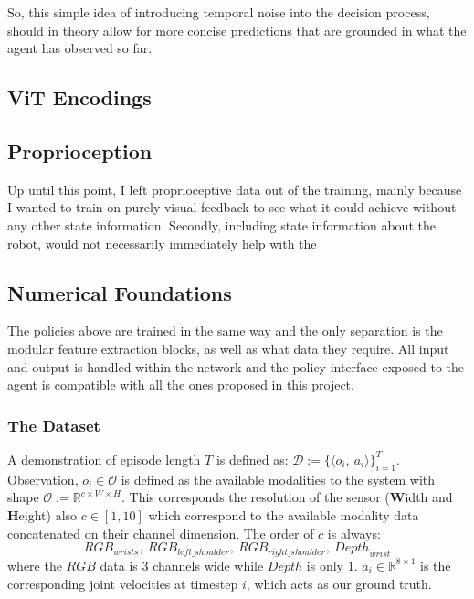 So, this simple idea of introducing temporal noise into the decision process, should in theory allow for more concise predictions that are grounded in what the agent has observed so far.

\subsection{ViT Encodings}



\subsection{Proprioception}
Up until this point, I left proprioceptive data out of the training, mainly because I wanted to train on purely visual feedback to see what it could achieve without any other state information. Secondly, including state information about the robot, would not necessarily immediately help with the 

\subsection{Numerical Foundations}

The policies above are trained in the same way and the only separation is the modular feature extraction blocks, as well as what data they require. All input and output is handled within the network and the policy interface exposed to the agent is compatible with all the ones proposed in this project.

\subsubsection{The Dataset}
A demonstration of episode length $T$ is defined as: \(\mathcal{D} := \{\langle o_i, ~a_i\rangle\}_{i = 1}^{T} \). Observation, \(o_i \in \mathcal{O}\) is defined as the available modalities to the system with shape \(\mathcal{O} := \mathbb{R}^{c \times W \times H}\). This corresponds the resolution of the sensor (\textbf{W}idth and \textbf{H}eight) also $c \in \left[1, 10\right]$ which correspond to the available modality data concatenated on their channel dimension. The order of $c$ is always:
\[
{RGB}_{wrists}, ~{RGB}_{{left}\_{shoulder}}, ~{RGB}_{{right}\_{shoulder}}, ~{Depth}_{wrist}
\] 
where the $RGB$ data is $3$ channels wide while $Depth$ is only 1. \(a_i \in \mathbb{R}^{8 \times 1}\) is the corresponding joint velocities at timestep $i$, which acts as our ground truth. 

